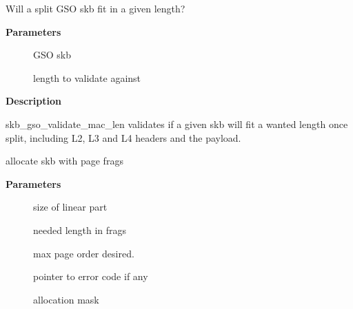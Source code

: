 \documentclass[a4paper,8pt,english]{sphinxmanual}
\begin{document}
\begin{fulllineitems}
\label{networking/kapi:c.skb_gso_validate_mac_len}
Will a split GSO skb fit in a given length?

\end{fulllineitems}


\textbf{Parameters}
\begin{description}
\item[{}] \leavevmode
GSO skb

\item[{}] \leavevmode
length to validate against

\end{description}

\textbf{Description}

skb\_gso\_validate\_mac\_len validates if a given skb will fit a wanted
length once split, including L2, L3 and L4 headers and the payload.

\begin{fulllineitems}
\label{networking/kapi:c.alloc_skb_with_frags}
allocate skb with page frags

\end{fulllineitems}


\textbf{Parameters}
\begin{description}
\item[{}] \leavevmode
size of linear part

\item[{}] \leavevmode
needed length in frags

\item[{}] \leavevmode
max page order desired.

\item[{}] \leavevmode
pointer to error code if any

\item[{}] \leavevmode
allocation mask

\end{description}
\end{document}

